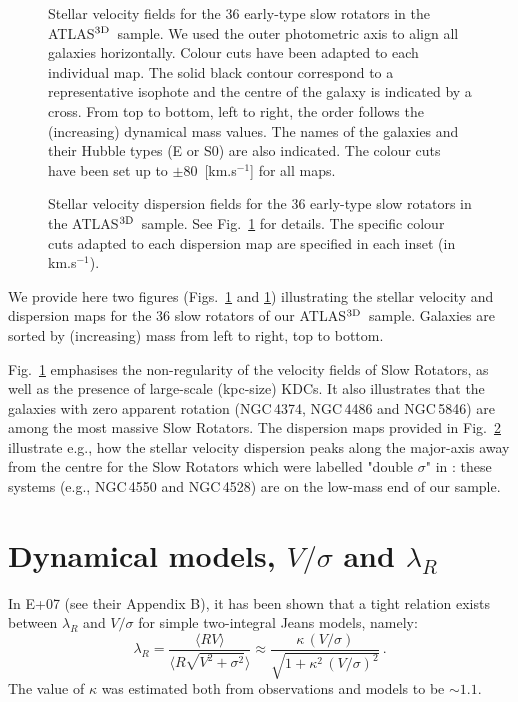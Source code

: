 \documentclass[useAMS,usenatbib,usegraphicx]{mn2e}
\newcommand{\atlas}{{ATLAS$^{\rm 3D}$}}
\begin{document}
\begin{figure}
\centering
{}
\caption{Stellar velocity fields for the 36 early-type slow rotators in the
\atlas\ sample. We used the outer photometric axis to align all galaxies horizontally.
Colour cuts have been adapted to each individual map. The solid black contour
correspond to a representative isophote and the centre of the galaxy is indicated by a cross.
From top to bottom, left to right, the order follows the (increasing) dynamical
mass values. The names of the galaxies and their Hubble types (E or S0) are also indicated. The colour cuts have
been set up to $\pm 80$~[km.s$^{-1}$] for all maps.}
\label{fig:SlowVmaps}
\end{figure}
\begin{figure}
\centering
{}
\caption{Stellar velocity dispersion fields for the 36 early-type slow rotators in the
\atlas\ sample. See Fig.~\ref{fig:SlowVmaps} for details. The specific colour cuts
adapted to each dispersion map are specified in each inset (in km.s$^{-1}$).}
\label{fig:SlowSmaps}
\end{figure}

We provide here two figures (Figs.~\ref{fig:SlowVmaps} and \ref{fig:SlowVmaps}) illustrating the stellar velocity and dispersion maps for the 36 slow
rotators of our \atlas\ sample. Galaxies are sorted by (increasing) mass from
left to right, top to bottom.

Fig.~\ref{fig:SlowVmaps} emphasises the non-regularity of
the velocity fields of Slow Rotators, as well as the presence of large-scale
(kpc-size) KDCs. It also illustrates that the galaxies with zero apparent
rotation (NGC\,4374, NGC\,4486 and NGC\,5846) are among the most massive Slow
Rotators. The dispersion maps provided in Fig.~\ref{fig:SlowSmaps} illustrate e.g., how the
stellar velocity dispersion peaks along the major-axis away from the centre for
the Slow Rotators which were labelled "double $\sigma$" in \cite{Krajnovic+11}:
these systems (e.g., NGC\,4550 and NGC\,4528) are on the low-mass end of our
sample.

\section{Dynamical models, $V/\sigma$ and $\lambda_R$}

In E+07 (see their Appendix B), it has been shown that a tight relation exists between $\lambda_R$
and $V/\sigma$ for simple two-integral Jeans models, namely:
\begin{equation}
\lambda_R = \frac{\langle R V \rangle}{\langle R  \sqrt{ V^2 + \sigma^2 }\rangle}
\approx \frac{\kappa \, \left( V / \sigma \right)}{\sqrt{1 + \kappa^2 \, \left( V / \sigma \right)^2}}
\, .
\label{eq:kappa}
\end{equation}
The value of $\kappa$ was estimated both from observations and models to be $\sim 1.1$. 
\end{document}
